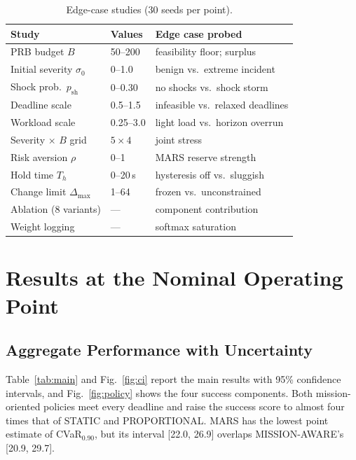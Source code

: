\documentclass[conference]{IEEEtran}
\newcommand{\figref}[1]{Fig.~\ref{#1}}
\begin{document}
\begin{table}[t]
\centering
\caption{Edge-case studies (30 seeds per point).}
\label{tab:edge}
\scriptsize
\begin{tabular}{lll}
\toprule
Study & Values & Edge case probed\\
\midrule
PRB budget $B$ & 50--200 & feasibility floor; surplus\\
Initial severity $\sigma_0$ & 0--1.0 & benign vs.\ extreme incident\\
Shock prob.\ $p_{\mathrm{sh}}$ & 0--0.30 & no shocks vs.\ shock storm\\
Deadline scale & 0.5--1.5 & infeasible vs.\ relaxed deadlines\\
Workload scale & 0.25--3.0 & light load vs.\ horizon overrun\\
Severity $\times$ $B$ grid & $5\times4$ & joint stress\\
Risk aversion $\rho$ & 0--1 & MARS reserve strength\\
Hold time $T_h$ & 0--20\,s & hysteresis off vs.\ sluggish\\
Change limit $\Delta_{\max}$ & 1--64 & frozen vs.\ unconstrained\\
Ablation (8 variants) & --- & component contribution\\
Weight logging & --- & softmax saturation\\
\bottomrule
\end{tabular}
\end{table}

\section{Results at the Nominal Operating Point}\label{sec:results}
\subsection{Aggregate Performance with Uncertainty}
Table~\ref{tab:main} and \figref{fig:ci} report the main results with 95\% confidence intervals, and \figref{fig:policy} shows the four success components. Both mission-oriented policies meet every deadline and raise the success score to almost four times that of STATIC and PROPORTIONAL. MARS has the lowest point estimate of CVaR$_{0.90}$, but its interval [22.0, 26.9] overlaps MISSION-AWARE's [20.9, 29.7].
\end{document}
